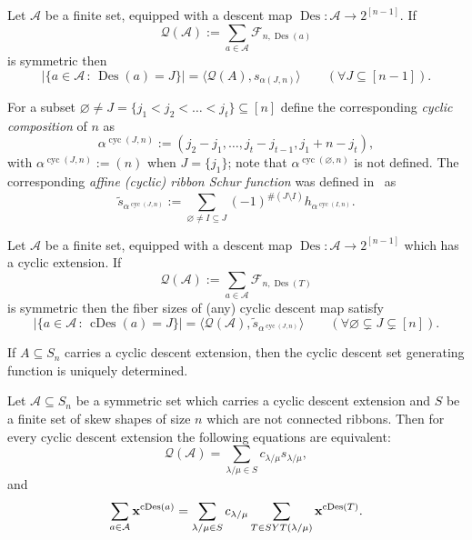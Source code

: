 \documentclass[ALCO,published]{cedram}
\newcommand{\Q}{\mathcal Q}
\newcommand{\f}{\mathcal F}
\newcommand{\A}{\mathcal A}
\DeclareMathOperator\Des{Des}
\DeclareMathOperator\cDes{cDes}
\DeclareMathOperator\cyc{cyc}
\newcommand\ccomp[2]{\alpha^{\cyc{(#2,#1)}}}
\newcommand{\cs}{\tilde s}
\def\SYT{{\rm SYT}}
\begin{document}
\begin{theorem} \label{thm:fiber-Des}
    Let  $\A$ be a finite set, equipped with a descent map
    $\Des: \A \longrightarrow 2^{[n-1]}$. 
    If 
    \[
        \Q(\A) :=
        \sum_{a\in \A} \f_{n,\Des(a)}
    \]
    is symmetric then
    \[
        |\{a \in \A \,:\, \Des(a)=J\}| = \langle \Q(A), s_{\alpha(J,n)} \rangle
        \qquad (\forall J\subseteq [n-1]).
    \]
\end{theorem}

For a subset $\varnothing \ne J = \{ j_1 < j_2 < \ldots < j_t \}
\subseteq [n]$
define the corresponding {\em cyclic composition} of $n$  as
\[
    \ccomp{n}{J} := 
    (j_2-j_1, \ldots, j_t - j_{t-1}, j_1 + n - j_t),
\]
with $\ccomp{n}{J} := (n)$ when $J = \{j_1\}$;
note that $\ccomp{n}{\varnothing}$ is not defined.
The corresponding {\em affine (cyclic) ribbon Schur function} was defined in~\cite{ARR} as
\[
    \cs_{\ccomp{n}{J}} := 
    \sum_{\varnothing \neq I \subseteq J}
    (-1)^{\#(J \setminus I)} h_{\ccomp{n}{I}}.
\]

\begin{theorem}\label{thm:fiber-cDes}
    Let $\A$ be a finite set, equipped with a descent map
    $\Des: \A \longrightarrow 2^{[n-1]}$ 
    which has a cyclic  extension. If
    \[
        \Q(\A):=\sum\limits_{a\in \A} \f_{n,\Des(T)}
    \]
    is symmetric then the fiber sizes of (any) cyclic descent map satisfy
    \[
        |\{a \in \A \,:\, \cDes(a) =J\}|
        = \langle \Q(\A), \cs_{\ccomp{n}{J}} \rangle
        \qquad \left( \forall \varnothing \subsetneq J \subsetneq [n] \right).
    \]
\end{theorem}

\begin{proposition} If $A\subseteq S_n$ carries a cyclic descent extension, then 
the cyclic descent set generating function is uniquely determined.
\end{proposition}

\begin{corollary}\label{cor:cDes-dist-Schur}
    Let $\A\subseteq S_n$ be a symmetric set which carries a cyclic descent extension 
    and $S$ be a finite set of skew shapes of size $n$ which are not connected ribbons. Then 
    for every cyclic descent extension 
    the following equations are equivalent:
    \begin{equation}\label{eq:dist1}
        \Q(\A) = \sum\limits_{\lambda/\mu\in S} c_{\lambda/\mu} s_{\lambda/\mu},
    \end{equation}
    and
    \begin{equation}\label{eq:dist2}
        \sum\limits_{a\in \A} {\bf x}^{\cDes(a)} = \sum\limits_{\lambda/\mu\in S} c_{\lambda/\mu} 
        \sum\limits_{T\in \SYT(\lambda/\mu)} {\bf x}^{\cDes(T)}.
    \end{equation}
\end{corollary}
\end{document}
